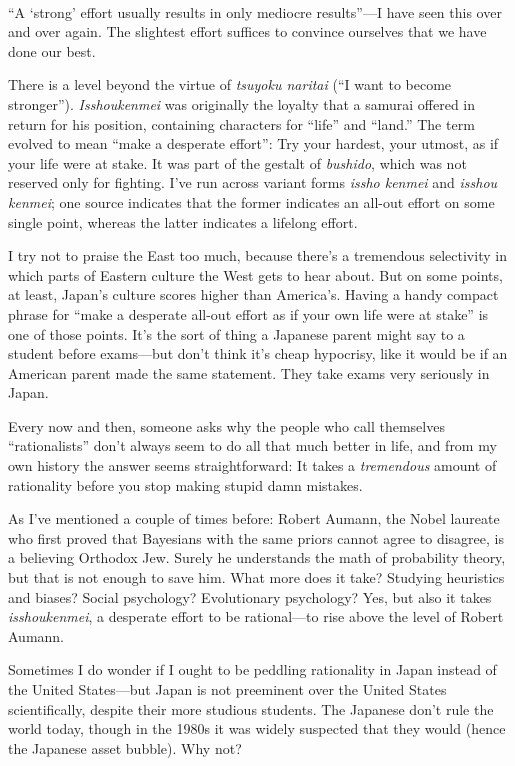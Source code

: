 \bigskip

{
 ~}

{
 ``A `strong'
effort usually results in only mediocre results''---I
have seen this over and over again. The slightest effort suffices to
convince ourselves that we have done our best.}

{
 There is a level beyond the virtue of \textit{tsuyoku naritai}
(``I want to become stronger'').
\textit{Isshoukenmei} was originally the loyalty that a samurai offered
in return for his position, containing characters for
``life'' and
``land.'' The term evolved to mean
``make a desperate effort'': Try
your hardest, your utmost, as if your life were at stake. It was part
of the gestalt of \textit{bushido}, which was not reserved only for
fighting. I've run across variant forms \textit{issho
kenmei} and \textit{isshou kenmei}; one source indicates that the
former indicates an all-out effort on some single point, whereas the
latter indicates a lifelong effort.}

{
 I try not to praise the East too much, because
there's a tremendous selectivity in which parts of
Eastern culture the West gets to hear about. But on some points, at
least, Japan's culture scores higher than
America's. Having a handy compact phrase for
``make a desperate all-out effort as if your own life
were at stake'' is one of those points.
It's the sort of thing a Japanese parent might say to a
student before exams---but don't think
it's cheap hypocrisy, like it would be if an American
parent made the same statement. They take exams very seriously in
Japan.}

{
 Every now and then, someone asks why the people who call
themselves ``rationalists''
don't always seem to do all that much better in life,
and from my own history the answer seems straightforward: It takes a
\textit{tremendous} amount of rationality before you stop making stupid
damn mistakes.}

{
 As I've mentioned a couple of times before: Robert
Aumann, the Nobel laureate who first proved that Bayesians with the
same priors cannot agree to disagree, is a believing Orthodox Jew.
Surely he understands the math of probability theory, but that is not
enough to save him. What more does it take? Studying heuristics and
biases? Social psychology? Evolutionary psychology? Yes, but also it
takes \textit{isshoukenmei}, a desperate effort to be rational---to
rise above the level of Robert Aumann.}

{
 Sometimes I do wonder if I ought to be peddling rationality in
Japan instead of the United States---but Japan is not preeminent over
the United States scientifically, despite their more studious students.
The Japanese don't rule the world today, though in the
1980s it was widely suspected that they would (hence the Japanese asset
bubble). Why not?}

